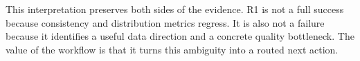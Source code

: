 This interpretation preserves both sides of the evidence. \feedbackprobe{} R1 is not a full success because consistency and distribution metrics regress. It is also not a failure because it identifies a useful data direction and a concrete quality bottleneck. The value of the workflow is that it turns this ambiguity into a routed next action.
